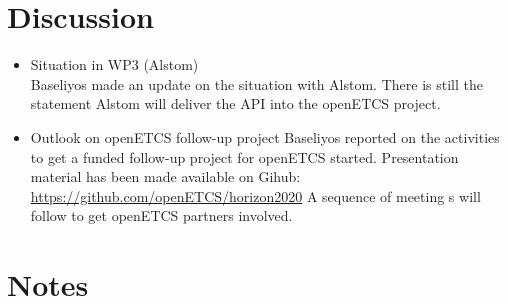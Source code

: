 \documentclass[a4paper, 11pt]{article}
\begin{document}
\section{Discussion}
\begin{itemize}
\item Situation in WP3 (Alstom)\\
Baseliyos made an update on the situation with Alstom. There is still the statement Alstom will deliver the API into the openETCS project.

\item Outlook on openETCS follow-up project
Baseliyos reported on the activities to get a funded follow-up project for openETCS started. Presentation material has been made available on Gihub: \url{https://github.com/openETCS/horizon2020}
A sequence of meeting s will follow to get openETCS partners involved.
\end{itemize}

\section{Notes}
\end{document}

